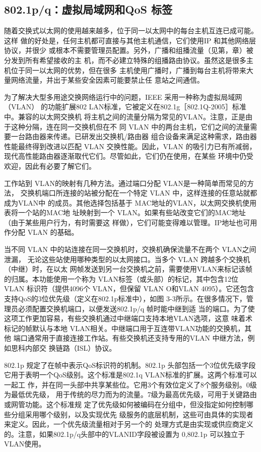 \subsection{802.1p/q：虚拟局域网和QoS 标签}

随着交换式以太网的使用越来越多，位于同一以太网中的每台主机互连已成可能。这样
做的好处是，任何主机都可直接与其他主机通信，它们使用IP 和其他网络层协议，并很少
或根本不需要管理员配置。另外，广播和组播流量（见第，章）被分发到所有希望接收的主
机，而不必建立特殊的组播路由协议。虽然这是很多主机位于同一以太网的优势，但在很多
主机使用广播时，广播到每台主机将带来大量网络流量，并出于某些安全因素可能要禁止任
意站之间通信。

为了解决大型多用途交换网络运行中的问题，IEEE 采用一种称为虚拟局域网（VLAN）
的功能扩展802 LAN标准，它被定义在802.1g［802.1Q-2005］标准中。兼容的以太网交换机
将主机之间的流量分隔为常见的VLAN。注意，正是由于这种分隔，连在同一交换机但在不
同 VLAN 中的两台主机，它们之间的流量需要一台路由器来传递。已研发出交换机/路由器
组合设备来满足这种需求，路由器性能最终得到改进以匹配 VLAN 交换性能。因此，VLAN
的吸引力已有所减弱，现代高性能路由器逐渐取代它们。尽管如此，它们仍在使用，在某些
环境中仍受欢迎，因此有必要了解它们。

工作站到 VLAN的映射有几种方法。通过端口分配 VLAN是一种简单而常见的方法，
交换机端口所连接的站被分配在一个特定 VLAN 中，这样连接的任意站就都成为VLAN中
的成员。其他选择包括基于 MAC地址的VLAN，以太网交换机使用表将一个站的MAC地
址映射到一个 VLAN。如果有些站改变它们的MAC地址（由于某些用户行为，有时需要这
样做），它们可能变得难以管理。IP地址也可用作分配 VLAN 的基础。

当不同 VLAN 中的站连接在同一交换机时，交换机确保流量不在两个 VLAN之间泄漏，
无论这些站使用哪种类型的以太网接口。当多个 VLAN 跨越多个交换机（中继）时，在以太
网帧发送到另一台交换机之前，需要使用VLAN来标记该帧的归属。本功能使用一个称为
VLAN标签（或头部）的标记，其中包含12位 VLAN 标识符（提供4096个 VLAN，但保留
VLAN O和VLAN 4095）。它还包含支持QoS的3位优先级（定义在802.1p标准中），如图
3-3所示。在很多情况下，管理员必须配置交换机端口，以便发送802.1p/q 帧时能中继到适
当的端口。为了使这项工作更加容易，有些交换机通过中继端口支持本地VLAN选项，这意
味着术标记的帧默认与本地 VLAN相关。中继端口用于互连带VLAN功能的交换机，其他
端口通常用于直接连接工作站。有些交换机还支持专用的VLAN 中继方法，例如思科内部交
换链路（ISL）协议。

802.1p 规定了在帧中表示QoS标识符的机制。802.1p 头部包括一个3位优先级字段
它用于表明一个QoS级别。这个标准是802.1q VLAN标准的扩展。这两个标准可以一起工
作，并在同一头部中共享某些位。它用3个有效位定义了8个服务级别。0级为最低优先级，
用于传统的尽力而为的流量。7级为最高优先级，可用于关键路由或网管功能。这个标准规
定了优先级如何被编码在分组中，但没指定如何控制哪些分组采用哪个级别，以及实现优先
级服务的底层机制，这些可由具体的实现者来定义。因此，一个优先级流量相对于另一个的
处理方式是由实现或供应商定义的。注意，如果802.1p/q头部中的VLANID字段被设置为
0,802.1p 可以独立于 VLAN使用。

